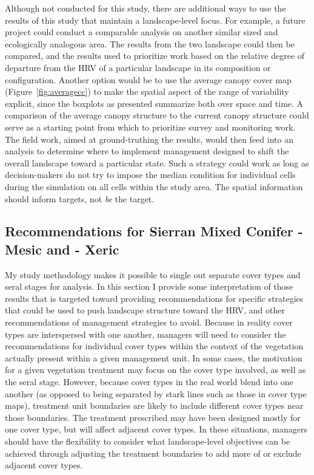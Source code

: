 Although not conducted for this study, there are additional ways to use the results of this study that maintain a landscape-level focus. For example, a future project could conduct a comparable analysis on another similar sized and ecologically analogous area. The results from the two landscape could then be compared, and the results used to prioritize work based on the relative degree of departure from the HRV of a particular landscape in its composition or configuration. Another option would be to use the average canopy cover map (Figure~\ref{fig:averagecc}) to make the spatial aspect of the range of variability explicit, since the boxplots as presented summarize both over space and time. A comparison of the average canopy structure to the current canopy structure could serve as a starting point from which to prioritize survey and monitoring work. The field work, aimed at ground-truthing the results, would then feed into an analysis to determine where to implement management designed to shift the overall landscape toward a particular state. Such a strategy could work as long as decision-makers do not try to impose the median condition for individual cells during the simulation on all cells within the study area. The spatial information should inform targets, not \emph{be} the target.

\subsection{Recommendations for Sierran Mixed Conifer - Mesic and - Xeric}
My study methodology makes it possible to single out separate cover types and seral stages for analysis. In this section I provide some interpretation of those results that is targeted toward providing recommendations for specific strategies that could be used to push landscape structure toward the HRV, and other recommendations of management strategies to avoid. Because in reality cover types are interspersed with one another, managers will need to consider the recommendations for individual cover types within the context of the vegetation actually present within a given management unit. In some cases, the motivation for a given vegetation treatment may focus on the cover type involved, as well as the seral stage. However, because cover types in the real world blend into one another (as opposed to being separated by stark lines such as those in cover type maps), treatment unit boundaries are likely to include different cover types near those boundaries. The treatment prescribed may have been designed mostly for one cover type, but will affect adjacent cover types. In these situations, managers should have the flexibility to consider what landscape-level objectives can be achieved through adjusting the treatment boundaries to add more of or exclude adjacent cover types.

